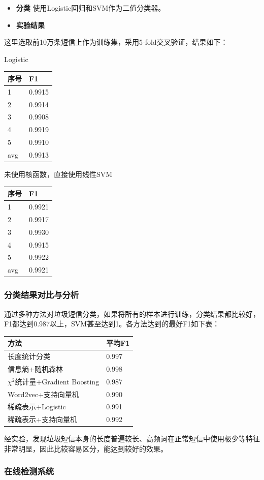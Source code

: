 \begin{itemize}
\item
  \textbf{分类} 使用Logistic回归和SVM作为二值分类器。
\item
  \textbf{实验结果}
\end{itemize}

这里选取前10万条短信上作为训练集，采用5-fold交叉验证，结果如下：

Logistic

\begin{longtable}[]{@{}ll@{}}
\toprule
序号 & F1\tabularnewline
\midrule
\endhead
1 & 0.9915\tabularnewline
2 & 0.9914\tabularnewline
3 & 0.9908\tabularnewline
4 & 0.9919\tabularnewline
5 & 0.9910\tabularnewline
avg & 0.9913\tabularnewline
\bottomrule
\end{longtable}

未使用核函数，直接使用线性SVM

\begin{longtable}[]{@{}ll@{}}
\toprule
序号 & F1\tabularnewline
\midrule
\endhead
1 & 0.9921\tabularnewline
2 & 0.9917\tabularnewline
3 & 0.9930\tabularnewline
4 & 0.9915\tabularnewline
5 & 0.9922\tabularnewline
avg & 0.9921\tabularnewline
\bottomrule
\end{longtable}

\subsubsection{分类结果对比与分析}\label{ux5206ux7c7bux7ed3ux679cux5bf9ux6bd4ux4e0eux5206ux6790}

通过多种方法对垃圾短信分类，如果将所有的样本进行训练，分类结果都比较好，F1都达到0.987以上，SVM甚至达到1。各方法达到的最好F1如下表：

\begin{longtable}[]{@{}ll@{}}
\toprule
方法 & 平均F1\tabularnewline
\midrule
\endhead
长度统计分类 & 0.997\tabularnewline
信息熵+随机森林 & 0.998\tabularnewline
\(\chi^2\)统计量+Gradient Boosting & 0.987\tabularnewline
Word2vec+支持向量机 & 0.990\tabularnewline
稀疏表示+Logistic & 0.991\tabularnewline
稀疏表示+支持向量机 & 0.992\tabularnewline
\bottomrule
\end{longtable}

经实验，发现垃圾短信本身的长度普遍较长、高频词在正常短信中使用极少等特征非常明显，因此比较容易区分，能达到较好的效果。

\subsubsection{在线检测系统}\label{ux5728ux7ebfux68c0ux6d4bux7cfbux7edf}

